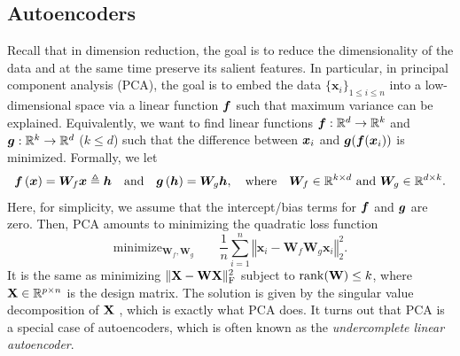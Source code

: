 \subsection{Autoencoders}
Recall that in dimension reduction, the goal is to reduce the dimensionality of the data and at the same time preserve its salient features. In particular, in principal component analysis (PCA), the goal is to embed the data $\{\bm{x}_{i}\}_{1\leq i\leq n}$ into a low-dimensional space via a linear function $\text{\boldmath $f$}$ such that maximum variance can be explained. Equivalently, we want to find linear functions $\text{\boldmath $f$}: \mathbb{R}^d \to \mathbb{R}^k$ and $\text{\boldmath $g$}: \mathbb{R}^k \to \mathbb{R}^d$ ($k \le d$) such that the difference between $\text{\boldmath $x$}_i$ and $\text{\boldmath $g$}(\text{\boldmath $f$}(\text{\boldmath $x$}_i))$ is minimized. Formally, we let
\[
\text{\boldmath $f$}\left(\bm{x}\right)=\bm{W}_f\bm{x}\triangleq \text{\boldmath $h$} \quad\text{and}\quad \text{\boldmath $g$}\left(\bm{h}\right)=\bm{W}_g\bm{h}, \quad \text{where}\quad\bm{W}_f\in\mathbb{R}^{k\times d}\text{ and } \bm{W}_g\in\mathbb{R}^{d\times k}.
\]
Here, for simplicity, we assume that the intercept/bias terms for $\text{\boldmath $f$}$ and $\text{\boldmath $g$}$ are zero. Then, PCA amounts to minimizing the quadratic loss function
\begin{equation}
\text{minimize}_{\bm{W}_f, \bm{W}_g}\qquad \frac{1}{n} \sum_{i=1}^{n}\left\Vert \bm{x}_i-\bm{W}_f\bm{W}_g\bm{x}_i\right\Vert _{2}^{2}.\label{eq:linear-AE}
\end{equation}
It is the same as minimizing $\| \mathrm{\bf X} - \mathrm{\bf W} \mathrm{\bf X} \|_{\mathrm{F}}^2$ subject to $\mathrm{rank}(\mathrm{\bf W}) \le k$, where $\mathrm{\bf X}\in \mathbb{R}^{p\times n}$ is the design matrix. The solution is given by the singular value decomposition of $\mathrm{\bf X}$ \citep[Thm.~2.4.8]{golub2013matrix}, which is exactly what PCA does. It turns out that PCA is a special case of autoencoders, which is often known as the \textit{undercomplete linear autoencoder}.

